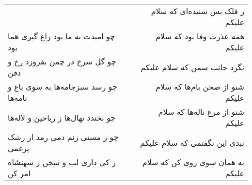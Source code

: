 \begin{center}
\begin{longtable}{l p{0.5cm} r}
&&
ز فلک بس شنیده‌ای که سلام علیکم
\\
چو امیدت به ما بود زاغ گیری هما بود
&&
همه عذرت وفا بود که سلام علیکم
\\
چو گل سرخ در چمن بفروزد رخ و ذقن
&&
نگرد جانب سمن که سلام علیکم
\\
چو رسد سبزجامه‌ها به سوی باغ و نامه‌ها
&&
شنو از صحن بام‌ها که سلام علیکم
\\
چو بخندد نهال‌ها ز ریاحین و لاله‌ها
&&
شنو از مرغ ناله‌ها که سلام علیکم
\\
چو ز مستی زنم دمی رمد از رشک پرغمی
&&
نبدی این نگفتمی که سلام علیکم
\\
ز کی داری لب و سخن ز شهنشاه امر کن
&&
به همان سوی روی کن که سلام علیکم
\\
\end{longtable}
\end{center}
